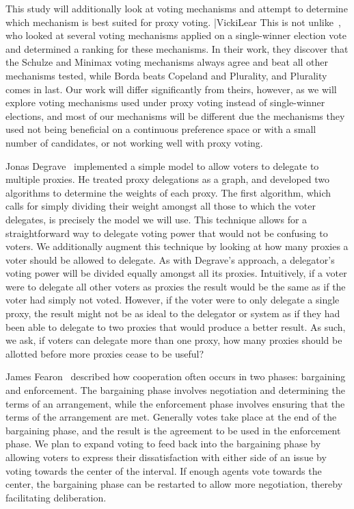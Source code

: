 This study will additionally look at voting mechanisms and attempt to determine which
mechanism is best suited for proxy voting.
|Vicki{Lear }
This is not unlike~\cite{Mathur2017}, who looked at several voting mechanisms applied
on a single-winner election vote and determined a ranking for these mechanisms.
In their work, they discover that the Schulze and Minimax voting mechanisms always
agree and beat all other mechanisms tested, while Borda beats Copeland and Plurality,
and Plurality comes in last.
Our work will differ significantly from theirs, however, as we will explore voting
mechanisms used under proxy voting instead of single-winner elections, and most of
our mechanisms will be different due the mechanisms they used not being beneficial on
a continuous preference space or with a small number of candidates, or not working well
with proxy voting.

Jonas Degrave~\cite{Degrave2014} implemented a simple model to allow voters to
delegate to multiple proxies.
He treated proxy delegations as a graph, and developed two algorithms to determine
the weights of each proxy.
The first algorithm, which calls for simply dividing their weight amongst all those
to which the voter delegates, is precisely the model we will use.
This technique allows for a straightforward way to delegate voting power that would
not be confusing to voters.
We additionally augment this technique by looking at how many proxies a voter should be
allowed to delegate.
As with Degrave's approach, a delegator's voting power will be divided equally amongst
all its proxies.
Intuitively, if a voter were to delegate all other voters as proxies the result would
be the same as if the voter had simply not voted.
However, if the voter were to only delegate a single proxy, the result might not be
as ideal to the delegator or system as if they had been able to delegate to two proxies
that would produce a better result.
As such, we ask, if voters can delegate more than one proxy, how many proxies should
be allotted before more proxies cease to be useful?

James Fearon~\cite{Fearon1998} described how cooperation often occurs in two phases:
bargaining and enforcement.
The bargaining phase involves negotiation and determining the terms of an arrangement,
while the enforcement phase involves ensuring that the terms of the arrangement are met.
Generally votes take place at the end of the bargaining phase, and the result is the
agreement to be used in the enforcement phase.
We plan to expand voting to feed back into the bargaining phase by allowing voters to
express their dissatisfaction with either side of an issue by voting towards the
center of the interval.
If enough agents vote towards the center, the bargaining phase can be restarted to
allow more negotiation, thereby facilitating deliberation.




